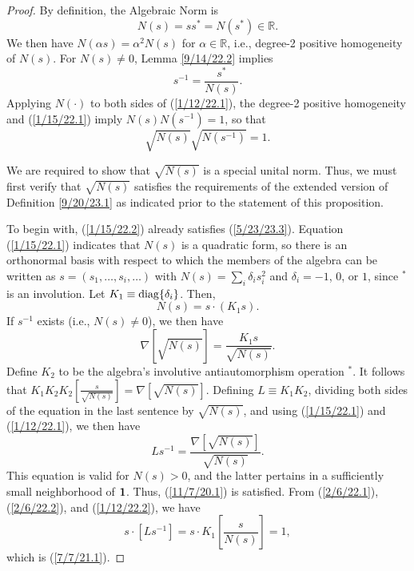 \documentclass{amsart}
\numberwithin{equation}{section}
\theoremstyle{definition}
\numberwithin{theorem}{section}
\begin{document}
\begin{proof} By definition, the Algebraic Norm is \begin{equation}\label{1/15/22.1} N(s)= ss^* = N(s^*)\in\mathbb{R}.\end{equation} 
 We then have $N(\alpha s) = \alpha^2 N(s)$ for $\alpha\in \mathbb{R}$, i.e., degree-2 positive homogeneity of $N(s)$.  
For $N(s)\ne 0$, Lemma \ref{9/14/22.2} implies 
\begin{equation}\label{1/12/22.1} s^{-1} = \frac{s^*}{N(s)}.\end{equation}
Applying $N(\cdot)$ to both sides of  (\ref{1/12/22.1}), the degree-2 positive homogeneity and (\ref{1/15/22.1}) imply $N(s)N(s^{-1})=1$, so that \begin{equation}\label{1/15/22.2} \sqrt{N(s)}\sqrt{N(s^{-1})}=1. \end{equation}

We are required to show that $\sqrt{N(s)}$ is a special unital norm.  Thus, we must first verify that $\sqrt{N(s)}$ satisfies the requirements of the extended  version of Definition \ref{9/20/23.1} as indicated prior to the statement of this proposition. 

To begin with, (\ref{1/15/22.2}) already satisfies  (\ref{5/23/23.3}).
 Equation (\ref{1/15/22.1}) indicates that $N(s)$ is a quadratic form, so there is an orthonormal basis with respect to which the members of the algebra can be written as $s= (s_1,\dots, s_i,\dots)$ with $N(s) = \sum_i \delta_i s_i^2$ and $\delta_i = -1$, $0$, or $1$, since $^*$ is an involution.  Let $K_1 \equiv {\rm diag}\{\delta_i\}$.   Then, \begin{equation}\label{2/6/22.1} N(s) = s\cdot(K_1 s).\end{equation}
If $s^{-1}$ exists (i.e., $N(s)\ne 0$), we then have \begin{equation}\label{2/6/22.2} \nabla\left[\sqrt{N(s)}\right] = \frac{K_1s}{\sqrt{N(s)}}.\end{equation}  Define $K_2$ to be the algebra's involutive antiautomorphism operation $^*$.  It follows that $K_1K_2K_2[\frac{s}{\sqrt{N(s)}}] = \nabla\left[\sqrt{N(s)}\right]$. Defining $L\equiv K_1K_2$, dividing both sides of the equation in the last sentence by $\sqrt{N(s)}$, and using (\ref{1/15/22.1}) and (\ref{1/12/22.1}), we then have \begin{equation}\label{1/12/22.2} Ls^{-1}  = \frac{\nabla\left[\sqrt{N(s)}\right]}{\sqrt{N(s)}} .\end{equation} This equation  is valid for $N(s)>0$, and the latter pertains in a sufficiently small neighborhood of ${\bf 1}$.  Thus,  (\ref{11/7/20.1}) is satisfied.  From (\ref{2/6/22.1}), (\ref{2/6/22.2}), and (\ref{1/12/22.2}), we have \[ s\cdot [Ls^{-1}] = s\cdot K_1\left[\frac{s}{N(s)}\right] = 1,\] which is (\ref{7/7/21.1}).  
 

\end{proof}
\end{document}
